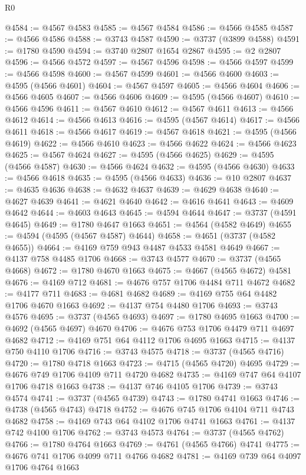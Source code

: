 \begin{lexlean}{R0}
\begin{coremodule}
@4584 := @4567 @4583
@4585 := @4567 @4584
@4586 := @4566 @4585
@4587 := @4566 @4586
@4588 := @3743 @4587
@4590 := @3737 (@3899 @4588)
@4591 := @1780 @4590
@4594 := @3740 @2807 @1654 @2867
@4595 := @2 @2807
@4596 := @4566 @4572
@4597 := @4567 @4596
@4598 := @4566 @4597
@4599 := @4566 @4598
@4600 := @4567 @4599
@4601 := @4566 @4600
@4603 := @4595 (@4566 @4601)
@4604 := @4567 @4597
@4605 := @4566 @4604
@4606 := @4566 @4605
@4607 := @4566 @4606
@4609 := @4595 (@4566 @4607)
@4610 := @4566 @4596
@4611 := @4567 @4610
@4612 := @4567 @4611
@4613 := @4566 @4612
@4614 := @4566 @4613
@4616 := @4595 (@4567 @4614)
@4617 := @4566 @4611
@4618 := @4566 @4617
@4619 := @4567 @4618
@4621 := @4595 (@4566 @4619)
@4622 := @4566 @4610
@4623 := @4566 @4622
@4624 := @4566 @4623
@4625 := @4567 @4624
@4627 := @4595 (@4566 @4625)
@4629 := @4595 (@4566 @4587)
@4630 := @4566 @4624
@4632 := @4595 (@4566 @4630)
@4633 := @4566 @4618
@4635 := @4595 (@4566 @4633)
@4636 := @10 @2807
@4637 := @4635 @4636
@4638 := @4632 @4637
@4639 := @4629 @4638
@4640 := @4627 @4639
@4641 := @4621 @4640
@4642 := @4616 @4641
@4643 := @4609 @4642
@4644 := @4603 @4643
@4645 := @4594 @4644
@4647 := @3737 (@4591 @4645)
@4649 := @1780 @4647 @1663
@4651 := @4564 (@4582 @4649)
@4655 := @4594 (@4595 (@4567 @4587) @4644)
@4658 := @4651 (@3737 (@4582 @4655))
@4664 := @4169 @759 @943 @4487 @4533 @4581 @4649
@4667 := @4137 @758 @4485 @1706
@4668 := @3743 @4577
@4670 := @3737 (@4565 @4668)
@4672 := @1780 @4670 @1663
@4675 := @4667 (@4565 @4672) @4581
@4676 := @4169 @712
@4681 := @4676 @757 @1706 @4484 @711 @4672
@4682 := @4177 @711
@4683 := @4681 @4682
@4689 := @4169 @755 @64 @4482 @1706 @4670 @1663
@4692 := @4137 @754 @4480 @1706
@4693 := @3743 @4576
@4695 := @3737 (@4565 @4693)
@4697 := @1780 @4695 @1663
@4700 := @4692 (@4565 @4697) @4670
@4706 := @4676 @753 @1706 @4479 @711 @4697 @4682
@4712 := @4169 @751 @64 @4112 @1706 @4695 @1663
@4715 := @4137 @750 @4110 @1706
@4716 := @3743 @4575
@4718 := @3737 (@4565 @4716)
@4720 := @1780 @4718 @1663
@4723 := @4715 (@4565 @4720) @4695
@4729 := @4676 @749 @1706 @4109 @711 @4720 @4682
@4735 := @4169 @747 @64 @4107 @1706 @4718 @1663
@4738 := @4137 @746 @4105 @1706
@4739 := @3743 @4574
@4741 := @3737 (@4565 @4739)
@4743 := @1780 @4741 @1663
@4746 := @4738 (@4565 @4743) @4718
@4752 := @4676 @745 @1706 @4104 @711 @4743 @4682
@4758 := @4169 @743 @64 @4102 @1706 @4741 @1663
@4761 := @4137 @742 @4100 @1706
@4762 := @3743 @4573
@4764 := @3737 (@4565 @4762)
@4766 := @1780 @4764 @1663
@4769 := @4761 (@4565 @4766) @4741
@4775 := @4676 @741 @1706 @4099 @711 @4766 @4682
@4781 := @4169 @739 @64 @4097 @1706 @4764 @1663

\end{coremodule}
\end{lexlean}
